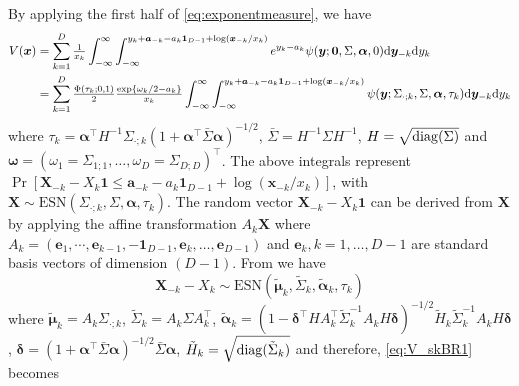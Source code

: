 \documentclass[12pt]{article}
\begin{document}
By applying the first half of \eqref{eq:exponentmeasure}, we have
\begin{align}
\label{eq:V_skBR1}
V(\bm x) &= 
\sum_{k=1}^D {\textstyle{1\over x_k}} \int_{-\infty}^\infty \int_{-\infty}^{y_k+\bm a_{-k}-a_k\bm 1_{D-1}+\log(\bm x_{-k}/x_k)} e^{y_k-a_k} \psi(\bm y;\bm 0, \Sigma,\bm \alpha, 0) \text d \bm y_{-k} \text d y_k \nonumber \\
&= \sum_{k=1}^D {\textstyle{\Phi\left(\tau_k; 0, 1\right)\over2}} {\textstyle{\exp \left\{\omega_k/2-a_k\right\}\over x_k}} \int_{-\infty}^\infty\int_{-\infty}^{y_k+ \bm a_{-k}-a_k\bm 1_{D-1}+\log(\bm x_{-k}/x_k)}
\psi(\bm y;\Sigma_{\cdot;k}, \Sigma, \bm \alpha, \tau_k)\text d \bm y_{-k} \text d y_k
\end{align}
where $\tau_k=\bm \alpha^\top H^{-1}\Sigma_{\cdot;k} \left(1+\bm\alpha^\top\bar\Sigma \bm\alpha \right)^{-1/2}$, $\bar{\Sigma} = H^{-1} \Sigma H^{-1}$, $H = \sqrt{{\rm diag}(\Sigma)}$  and $\bm \omega = \left( \omega_1=\Sigma_{1;1}, \ldots,  \omega_D=\Sigma_{D;D}\right)^\top$. The above integrals represent $\Pr[\bm X_{-k}-X_k \bm 1 \leq \bm a_{-k}-a_{k}\bm 1_{D-1}+\log(\bm x_{-k}/x_k)]$, with $\bm X \sim \text{ESN}(\Sigma_{\cdot;k},\Sigma,\bm \alpha, \tau_k)$. The random vector $\bm X_{-k}-X_k\bm 1$ can be derived from $\bm X$ by applying the affine transformation $A_k \bm X$ where $A_k = (\bm e_1,\cdots,\bm e_{k-1},-\bm 1_{D-1},\bm e_{k},\ldots,\bm e_{D-1})$ and $\bm e_k, k=1, \ldots, D-1$ are standard basis vectors of dimension $(D-1)$. From \citet[Chapter~5]{Azzalini:2013} we have 
%
$$
\bm X_{-k}-X_k \sim \text{ESN} \left( \tilde{\bm \mu}_k, \tilde \Sigma_k, \tilde{\bm \alpha}_k, \tau_k\right)
$$
%
where $\tilde {\bm \mu}_k = A_k\Sigma_{\cdot;k}$, 
$\tilde \Sigma_k = A_k\Sigma A_k^\top$, 
$\tilde{\bm \alpha}_k = (1-\bm\delta^\top H A_k^\top\tilde\Sigma_k^{-1}A_k H\bm\delta)^{-1/2} \tilde H_k \tilde\Sigma_k^{-1} A_k H \bm\delta$, 
$\bm \delta = \left( 1 + \bm \alpha^\top \bar{\Sigma} \bm \alpha\right)^{-1/2}\bar{\Sigma} \bm \alpha$, 
$\tilde H_k = \sqrt{{\rm diag}(\tilde\Sigma_k)}$
and therefore, \eqref{eq:V_skBR1} becomes
\end{document}
